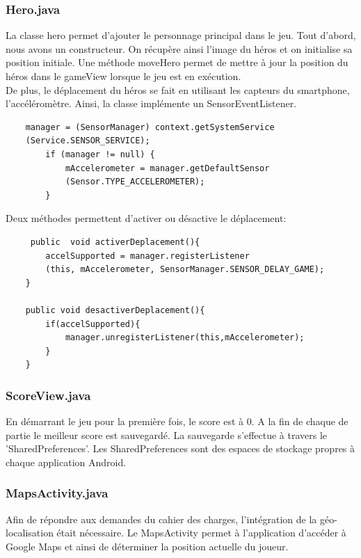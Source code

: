 \documentclass{article}
\begin{document}
\newpage
\subsubsection{Hero.java}
La classe hero permet d'ajouter le personnage principal dans le jeu. Tout d'abord, nous avons un constructeur. On récupère ainsi l'image du héros et on initialise sa position initiale. Une méthode moveHero permet de mettre à jour la position du héros dans le gameView lorsque le jeu est en exécution.\\

De plus, le déplacement du héros se fait en utilisant les capteurs du smartphone, l'accéléromètre. Ainsi, la classe implémente un SensorEventListener.

\begin{verbatim}
    manager = (SensorManager) context.getSystemService
    (Service.SENSOR_SERVICE);
        if (manager != null) {
            mAccelerometer = manager.getDefaultSensor
            (Sensor.TYPE_ACCELEROMETER);
        }
\end{verbatim}

Deux méthodes permettent d'activer ou désactive le déplacement:

\begin{verbatim}
     public  void activerDeplacement(){
        accelSupported = manager.registerListener
        (this, mAccelerometer, SensorManager.SENSOR_DELAY_GAME);
    }

    public void desactiverDeplacement(){
        if(accelSupported){
            manager.unregisterListener(this,mAccelerometer);
        }
    }
\end{verbatim}

\subsubsection{ScoreView.java}
En démarrant le jeu pour la première fois, le score est à 0. A la fin de chaque de partie le meilleur score est sauvegardé. La sauvegarde s’effectue à travers le ’SharedPreferences’. Les SharedPreferences sont des espaces de stockage propres à chaque application Android.

\newpage
\subsubsection{MapsActivity.java}
Afin de répondre aux demandes du cahier des charges, l’intégration de la géo-localisation était nécessaire. Le MapsActivity permet à l’application d’accéder à Google Maps et ainsi de déterminer la position actuelle du joueur. 
\end{document}
